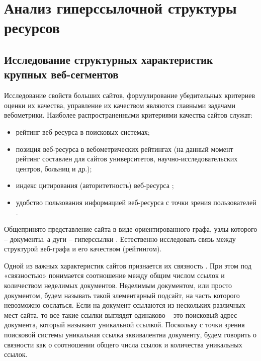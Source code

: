 \section{Анализ гиперссылочной структуры ресурсов}\label{sec:ch1/sec4}

\subsection{Исследование структурных характеристик крупных веб-сегментов}\label{subsec:ch1/sec4/sub2}

Исследование свойств больших сайтов, формулирование убедительных критериев оценки их качества, управление их качеством являются главными задачами вебометрики. Наиболее распространенными критериями качества сайтов служат:
\begin{itemize}
	\item рейтинг веб-ресурса в поисковых системах;
	\item позиция веб-ресурса в вебометрических рейтингах \cite{RankingWeb} (на данный момент рейтинг составлен для сайтов университетов, научно-исследовательских центров, больниц и др.);
	\item индекс цитирования (авторитетность) веб-ресурса \cite{ThelwallZuccala,Smith,Nicolaisen,OrtegaAguilloCothey};
	\item удобство пользования информацией веб-ресурса с точки зрения пользователей
	\cite{ChevalierDommesMartins,HarperChen,ZengProctorSalvendy,HuntingtonNicholasJamali}.
\end{itemize}

Общепринято представление сайта в виде ориентированного графа, узлы которого -- документы, а дуги -- гиперссылки \cite{BroderKumarMaghoul}. Естественно исследовать связь между структурой веб-графа и его качеством (рейтингом).

Одной из важных характеристик сайтов признается их связность \cite{Thelwall,ThelwallWilkinsonMusgrove}. При этом под «связностью» понимается соотношение между общим числом ссылок и количеством неделимых документов. Неделимым документом, или просто документом, будем называть такой элементарный подсайт, на часть которого невозможно сослаться. Если на документ ссылаются из нескольких различных мест сайта, то все такие ссылки выглядят одинаково -- это поисковый адрес документа, который называют уникальной ссылкой. Поскольку с точки зрения поисковой системы уникальная ссылка эквивалентна документу, будем говорить о связности как о соотношении общего числа ссылок и количества уникальных ссылок.

